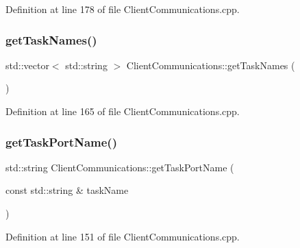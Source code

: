 Definition at line 178 of file Client\+Communications.\+cpp.

\hypertarget{classocra__recipes_1_1ClientCommunications_a821a74e8c4b20e1d3da18e1cf6b7e31d}{}\label{classocra__recipes_1_1ClientCommunications_a821a74e8c4b20e1d3da18e1cf6b7e31d} 
\subsubsection{\texorpdfstring{get\+Task\+Names()}{getTaskNames()}}
{\footnotesize\ttfamily std\+::vector$<$ std\+::string $>$ Client\+Communications\+::get\+Task\+Names (\begin{DoxyParamCaption}{ }\end{DoxyParamCaption})}



Definition at line 165 of file Client\+Communications.\+cpp.

\hypertarget{classocra__recipes_1_1ClientCommunications_ab915047503c4cbddbd26c2036f8340ed}{}\label{classocra__recipes_1_1ClientCommunications_ab915047503c4cbddbd26c2036f8340ed} 
\subsubsection{\texorpdfstring{get\+Task\+Port\+Name()}{getTaskPortName()}}
{\footnotesize\ttfamily std\+::string Client\+Communications\+::get\+Task\+Port\+Name (\begin{DoxyParamCaption}\item[{const std\+::string \&}]{task\+Name }\end{DoxyParamCaption})}



Definition at line 151 of file Client\+Communications.\+cpp.

\hypertarget{classocra__recipes_1_1ClientCommunications_abff3747f063489056f41c99edb7e1e3b}{}\label{classocra__recipes_1_1ClientCommunications_abff3747f063489056f41c99edb7e1e3b} 

